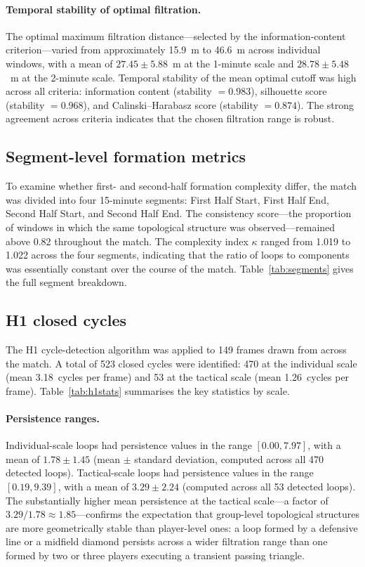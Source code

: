 \documentclass[11pt,a4paper]{article}
\begin{document}
\paragraph{Temporal stability of optimal filtration.}
The optimal maximum filtration distance---selected by the
information-content criterion---varied from approximately
15.9~m to 46.6~m across individual windows, with a mean
of \(27.45 \pm 5.88\)~m at the 1-minute scale and
\(28.78 \pm 5.48\)~m at the 2-minute scale.  Temporal
stability of the mean optimal cutoff was high across all
criteria: information content (stability \(= 0.983\)),
silhouette score (stability \(= 0.968\)), and
Calinski--Harabasz score (stability \(= 0.874\)).  The
strong agreement across criteria indicates that the chosen
filtration range is robust.

\subsection{Segment-level formation metrics}
\label{sec:segments}

To examine whether first- and second-half formation
complexity differ, the match was divided into four
15-minute segments: First Half Start, First Half End,
Second Half Start, and Second Half End.  The consistency
score---the proportion of windows in which the same
topological structure was observed---remained above 0.82
throughout the match.  The complexity index \(\kappa\)
ranged from 1.019 to 1.022 across the four segments,
indicating that the ratio of loops to components was
essentially constant over the course of the match.
Table~\ref{tab:segments} gives the full segment breakdown.

\subsection{H1 closed cycles}
\label{sec:h1loops}

The H1 cycle-detection algorithm was applied to 149 frames
drawn from across the match.  A total of 523 closed cycles
were identified: 470 at the individual scale (mean
3.18~cycles per frame) and 53 at the tactical scale (mean
1.26~cycles per frame).  Table~\ref{tab:h1stats}
summarises the key statistics by scale.

\paragraph{Persistence ranges.}
Individual-scale loops had persistence values in the range
\([0.00, 7.97]\), with a mean of \(1.78 \pm 1.45\)
(mean \(\pm\) standard deviation, computed across all
470 detected loops).
Tactical-scale loops had persistence values in the range
\([0.19, 9.39]\), with a mean of \(3.29 \pm 2.24\)
(computed across all 53 detected loops).
The substantially higher mean persistence at the tactical
scale---a factor of \(3.29/1.78 \approx 1.85\)---confirms
the expectation that group-level topological structures are
more geometrically stable than player-level ones: a loop
formed by a defensive line or a midfield diamond persists
across a wider filtration range than one formed by two or
three players executing a transient passing triangle.
\end{document}
